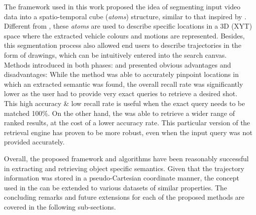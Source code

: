The framework used in this work proposed the idea of segmenting input video data into a spatio-temporal cube (\textit{atoms}) structure, similar to that inspired by \cite{castanon2016retrieval}. Different from \cite{castanon2016retrieval}, these \textit{atoms} are used to describe specific locations in a 3D (XYT) space where the extracted vehicle colours and motions are represented. %
Besides, this segmentation process also allowed end users to describe trajectories in the form of drawings, which can be intuitively entered into the search canvas. Methods introduced in both phases: \versionOneRet and \versionTwoRet presented obvious advantages and disadvantages: While the \versionOneRet method was able to accurately pinpoint locations in which an extracted semantic was found, the overall recall rate was significantly lower as the user had to provide very exact queries to retrieve a desired shot. This high accuracy \& low recall rate is useful when the exact query needs to be matched 100\%. On the other hand, the \versionTwoRet was able to retrieve a wider range of ranked results, at the cost of a lower accuracy rate. This particular version of the retrieval engine has proven to be more robust, even when the input query was not provided accurately. 

Overall, the proposed framework and algorithms have been reasonably successful in extracting and retrieving object specific semantics. Given that the trajectory information was stored in a pseudo-Cartesian coordinate manner, the concept used in the \versionTwoRet can be extended to various datasets of similar properties. The concluding remarks and future extensions for each of the proposed methods are covered in the following sub-sections.

